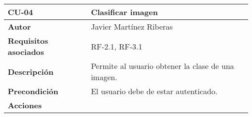 \begin{longtable}[H]{@{}ll@{}}
\toprule
\begin{minipage}[b]{0.26\columnwidth}\raggedright\strut%
\textbf{CU-04}\strut
\end{minipage} & \begin{minipage}[b]{0.68\columnwidth}\raggedright\strut%
\textbf{Clasificar imagen}\strut
\end{minipage}\tabularnewline
\midrule
\endhead
\begin{minipage}[t]{0.26\columnwidth}\raggedright\strut
\textbf{Autor}\strut
\end{minipage} & \begin{minipage}[t]{0.68\columnwidth}\raggedright\strut
Javier Martínez Riberas\strut
\end{minipage}\tabularnewline
\begin{minipage}[t]{0.26\columnwidth}\raggedright\strut
\textbf{Requisitos asociados}\strut
\end{minipage} & \begin{minipage}[t]{0.68\columnwidth}\raggedright\strut%
RF-2.1, RF-3.1\strut
\end{minipage}\tabularnewline
\begin{minipage}[t]{0.26\columnwidth}\raggedright\strut
\textbf{Descripción}\strut
\end{minipage} & \begin{minipage}[t]{0.68\columnwidth}\raggedright\strut%
Permite al usuario obtener la clase de una imagen.\strut
\end{minipage}\tabularnewline
\begin{minipage}[t]{0.26\columnwidth}\raggedright\strut
\textbf{Precondición}\strut
\end{minipage} & \begin{minipage}[t]{0.68\columnwidth}\raggedright\strut%
El usuario debe de estar autenticado.\strut
\end{minipage}\tabularnewline
\begin{minipage}[t]{0.26\columnwidth}\raggedright\strut
\textbf{Acciones}\strut
\end{minipage} & \begin{minipage}[t]{0.68\columnwidth}\raggedright\strut%

\end{minipage}
\end{longtable}
